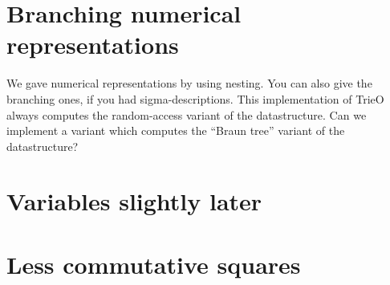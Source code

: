 \section{Branching numerical representations}
\begin{outline}
We gave numerical representations by using nesting. You can also give the branching ones, if you had sigma-descriptions. This implementation of TrieO always computes the random-access variant of the datastructure. Can we implement a variant which computes the ``Braun tree'' variant of the datastructure?
\end{outline}




\section{Variables slightly later}


\section{Less commutative squares}


